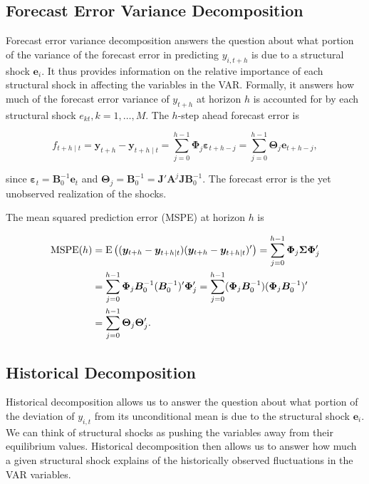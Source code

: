 \subsection{Forecast Error Variance Decomposition}

Forecast error variance decomposition answers the question about what portion of the variance of the forecast error in predicting $y_{i,t+h}$ is due to a structural shock $\bm{e}_i$. It thus provides information on the relative importance of each structural shock in affecting the variables in the VAR. Formally, it answers how much of the forecast error variance of $y_{t+h}$ at horizon $h$ is accounted for by each structural shock $e_{kt}, k = 1, \dots, M$. The $h$-step ahead forecast error is

\begin{equation}
	f_{t+h\mid t} = \bm{y}_{t+h} - \bm{y}_{t+h\mid t} = \sum^{h-1}_{j=0}\bm{\Phi}_j\bm{\varepsilon}_{t+h-j} = \sum^{h-1}_{j=0}\bm{\Theta}_j\bm{e}_{t+h-j},
\end{equation}

since $\bm{\varepsilon}_t = \bm{B}_0^{-1}\bm{e}_t$ and $\bm{\Theta}_j = \bm{B}_0^{-1} = \bm{J}'\bm{A}^j\bm{JB}_0^{-1}$. The forecast error is the yet unobserved realization of the shocks.

The mean squared prediction error (MSPE) at horizon $h$ is 

\begin{align}
	\nonumber\mathrm{MSPE}(h) &= \mathrm{E}\left({(\bm{y}_{t+h} - \bm{y}_{t+h\mid t})(\bm{y}_{t+h} - \bm{y}_{t+h\mid t})'}\right) = \sum^{h-1}_{j=0}\bm{\Phi}_j\bm{\Sigma\Phi}_j' \\
	 &= \sum^{h-1}_{j=0}\bm{\Phi}_j\bm{B}_0^{-1}(\bm{B}_0^{-1})'\bm{\Phi}_j' = \sum^{h-1}_{j=0}(\bm{\Phi}_j\bm{B}_0^{-1})(\bm{\Phi}_j\bm{B}_0^{-1})' \\
	\nonumber &= \sum^{h-1}_{j=0}\bm{\Theta}_j\bm{\Theta}_j'.
\end{align}

\subsection{Historical Decomposition}

Historical decomposition allows us to answer the question about what portion of the deviation of $y_{i,t}$ from its unconditional mean is due to the structural shock $\bm{e}_i$. We can think of structural shocks as pushing the variables away from their equilibrium values. Historical decomposition then allows us to answer how much a given structural shock explains of the historically observed fluctuations in the VAR variables.


